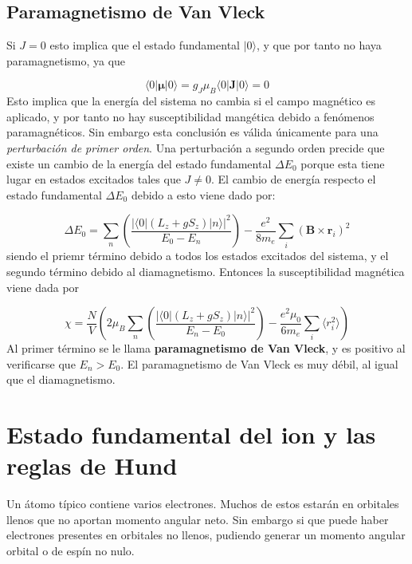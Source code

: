 \documentclass[12pt,a4paper]{book}
\numberwithin{equation}{section}
\numberwithin{figure}{section}
\newcommand{\parentesis}[1]{\left( #1  \right)}
\newcommand{\rn}{\mathbf{r}}
\newcommand{\Bn}{\mathbf{B}}
\newcommand{\Jn}{\mathbf{J}}
\newcommand{\mun}{\boldsymbol{\mu}}
\begin{document}
\subsection{Paramagnetismo de Van Vleck}

Si $J=0$ esto implica que el estado fundamental $|0\rangle$, y que por tanto no haya paramagnetismo, ya que

\begin{equation}
    \langle 0 | \mun | 0 \rangle = g_J \mu_B \langle 0 | \Jn |0 \rangle = 0
\end{equation}
Esto implica que la energía del sistema no cambia si el campo magnético es aplicado, y por tanto no hay susceptibilidad mangética debido a fenómenos paramagnéticos. Sin embargo esta conclusión es válida únicamente para una \textit{perturbación de primer orden}. Una perturbación a segundo orden precide que existe un cambio de la energía del estado fundamental $\Delta E_0$ porque esta tiene lugar en estados excitados tales que $J\neq 0$. El cambio de energía respecto el estado fundamental $\Delta E_0$ debido a esto viene dado por:

\begin{equation}
    \Delta E_0 = \sum_n \parentesis{ \frac{|\langle 0 |(L_z + g S_z)|n\rangle|^2}{E_0 - E_n} } - \frac{e^2}{8 m_e} \sum_i (\Bn \times \rn_i)^2
\end{equation}
siendo el priemr término debido a todos los estados excitados del sistema, y el segundo término debido al diamagnetismo. Entonces la susceptibilidad magnética viene dada por

\begin{equation}
    \chi = \frac{N}{V} \parentesis{ 2\mu_B \sum_n \parentesis{ \frac{|\langle 0 |(L_z + g S_z)|n\rangle|^2}{E_n - E_0} } - \frac{e^2 \mu_0}{6 m_e} \sum_i \langle r_i^2 \rangle }
\end{equation}
Al primer término se le llama \textbf{paramagnetismo de Van Vleck}, y es positivo al verificarse que $E_n>E_0$. El paramagnetismo de Van Vleck es muy débil, al igual que el diamagnetismo. 

\section{Estado fundamental del ion y las reglas de Hund}

Un átomo típico contiene varios electrones. Muchos de estos estarán en orbitales llenos que no aportan momento angular neto. Sin embargo si que puede haber electrones presentes en orbitales no llenos, pudiendo generar un momento angular orbital o de espín no nulo. \\
\end{document}

